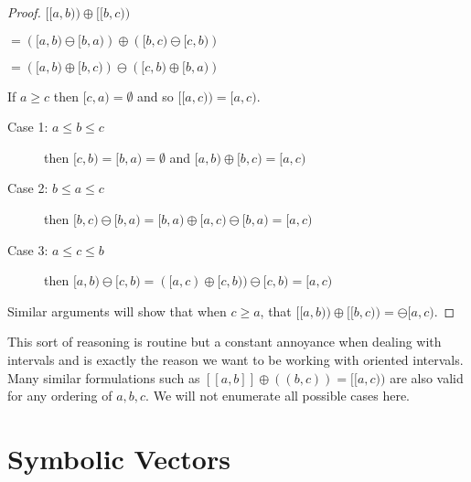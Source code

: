 
\begin{theorem}
	For all $a,b,c \in \mathbb{R}$ (regardless of relative ordering),
	\begin{equation}
		[\![ a,b )\!) \oplus [\![ b,c )\!) = [\![ a,c )\!)
	\end{equation}
\end{theorem}

\begin{proof}
	$[\![a,b)\!) \oplus [\![ b,c )\!)$ 

	$= \left( [a,b) \ominus [b,a) \right) \oplus \left( [b,c) \ominus [c,b) \right)$ 

	$= \left( [a,b) \oplus [b,c) \right) \ominus \left( [c,b) \oplus [b,a) \right)$

	If $a \geq c$ then $[c,a) = \emptyset$ and so $[\![a,c)\!) = [a,c)$. 
	\begin{description}
		\item[Case 1: $a \leq b \leq c$] then $[c,b) = [b,a) = \emptyset$ and $[a,b) \oplus [b,c) = [a,c)$
		\item[Case 2: $b \leq a \leq c$] then $[b,c) \ominus [b,a) = [b,a) \oplus [a,c) \ominus [b,a) = [a,c)$
		\item[Case 3: $a \leq c \leq b$] then $[a,b) \ominus [c,b) = ([a,c) \oplus [c,b)) \ominus [c,b) = [a,c)$
	\end{description}
	Similar arguments will show that when $c \geq a$, that $[\![a,b)\!) \oplus [\![ b,c )\!) = \ominus [a,c)$.
	
\end{proof}

This sort of reasoning is routine but a constant annoyance when dealing with intervals and is exactly the reason we want to be working with oriented intervals.
Many similar formulations such as $[\![ a,b ]\!] \oplus (\!( b,c )\!) = [\![a,c)\!)$ are also valid for any ordering of $a,b,c$.
We will not enumerate all possible cases here.




\newpage




%
%

\section{Symbolic Vectors}

